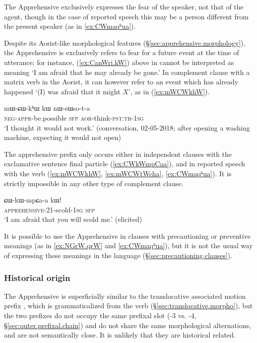  The Apprehensive exclusively expresses the fear of the speaker, not that of the agent, though in the case of reported speech this may be a person different from the present speaker (as in \ref{ex:CWmaqʰua}). 
  
Despite its Aorist-like morphological features (§\ref{sec:apprehensive.morphology}), the Apprehensive is exclusively refers to fear for a future event at the time of utterance; for instance, (\ref{ex:CanWri.kW}) above in cannot be interpreted as meaning  `I am afraid that he may already be gone.'  In complement clause with a matrix verb in the Aorist, it can however refer to an event which has already happened `(I) was afraid that it might $X$', as in (\ref{ex:mWCWkhW}). 
  
\begin{exe}
\ex \label{ex:mWCWkhW}
\gll   mɯ-ɕɯ-kʰɯ kɯ nɯ-sɯso-t-a \\
\textsc{neg}-\textsc{appr}-be.possible \textsc{sfp} \textsc{aor}-think-\textsc{pst}:\textsc{tr}-\textsc{1sg} \\
\glt `I thought it would not work.'  (conversation, 02-05-2018; after opening a washing machine, expecting it would not open)
\end{exe}
 
The apprehensive prefix  only occurs either in independent clauses with the exclamative sentence final particle  (\ref{ex:CWkWmpCaa}), and in reported speech with the verb  (\ref{ex:mWCWkhW}, \ref{ex:mWCWtWcha}, \ref{ex:CWmaqʰua}). It is strictly impossible in any other type of complement clause. 

 \begin{exe}
\ex \label{ex:CWkWmpCaa}
\gll  ɕɯ-kɯ-mpɕa-a kɯ!   \\
\textsc{apprehensive}-2\fl{}1-scold-\textsc{1sg} \textsc{sfp} \\
\glt  `I am afraid that you will scold me.' (elicited)
  \end{exe}

 It is possible to use the Apprehensive in clauses with precautioning or preventive meanings (as in \ref{ex:NGrW.qrW} and \ref{ex:CWmaqʰua}), but it is not the usual way of expressing these meanings in the language (§\ref{sec:precautioning.clauses}).


\subsubsection{Historical origin} \label{sec:apprehensive.history}
 
The Apprehensive  is superficially similar to the translocative associated motion prefix , which is grammaticalized from the verb  (§\ref{sec:translocative.morpho}), but the two prefixes do not occupy the same prefixal slot (-3 vs. -4, §\ref{sec:outer.prefixal.chain}) and do not share the same morphological alternations, and are not semantically close. It is unlikely that they are historical related.


